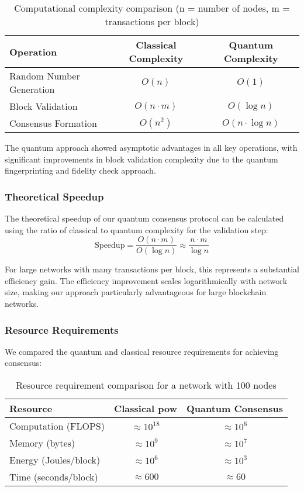 \documentclass[11pt,a4paper]{article}
\begin{document}
\begin{table}[H]
\centering
\begin{tabular}{lcc}
\toprule
\textbf{Operation} & \textbf{Classical Complexity} & \textbf{Quantum Complexity} \\
\midrule
Random Number Generation & $O(n)$ & $O(1)$ \\
Block Validation & $O(n \cdot m)$ & $O(\log n)$ \\
Consensus Formation & $O(n^2)$ & $O(n \cdot \log n)$ \\
\bottomrule
\end{tabular}
\caption{Computational complexity comparison (n = number of nodes, m = transactions per block)}
\label{tab:complexity}
\end{table}

The quantum approach showed asymptotic advantages in all key operations, with significant improvements in block validation complexity due to the quantum fingerprinting and fidelity check approach.

\subsubsection{Theoretical Speedup}
The theoretical speedup of our quantum consensus protocol can be calculated using the ratio of classical to quantum complexity for the validation step:
\begin{equation}
\text{Speedup} = \frac{O(n \cdot m)}{O(\log n)} \approx \frac{n \cdot m}{\log n}
\end{equation}

For large networks with many transactions per block, this represents a substantial efficiency gain. The efficiency improvement scales logarithmically with network size, making our approach particularly advantageous for large blockchain networks.

\subsubsection{Resource Requirements}
We compared the quantum and classical resource requirements for achieving consensus:

\begin{table}[H]
\centering
\begin{tabular}{lcc}
\toprule
\textbf{Resource} & \textbf{Classical \gls{pow}} & \textbf{Quantum Consensus} \\
\midrule
Computation (FLOPS) & $\approx 10^{18}$ & $\approx 10^6$ \\
Memory (bytes) & $\approx 10^9$ & $\approx 10^7$ \\
Energy (Joules/block) & $\approx 10^6$ & $\approx 10^3$ \\
Time (seconds/block) & $\approx 600$ & $\approx 60$ \\
\bottomrule
\end{tabular}
\caption{Resource requirement comparison for a network with 100 nodes}
\label{tab:resources}
\end{table}
\end{document}

